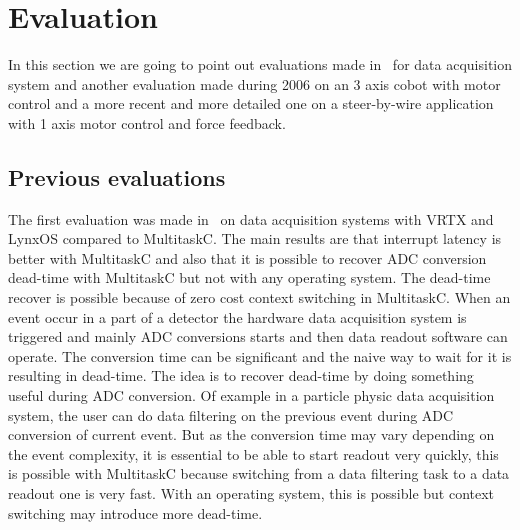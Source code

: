 \documentclass[10pt]{report}
\begin{document}
\chapter{Evaluation}
\label{sec:evaluation}

In this section we are going to point out evaluations made in~\cite{Delchini:95} for data acquisition system
and another evaluation made during 2006 on an 3 axis cobot with motor control and a more recent and more
detailed one on a steer-by-wire application with 1 axis motor control and force feedback.

\section{Previous evaluations}

The first evaluation was made in~\cite{Delchini:95} on data acquisition systems with VRTX and LynxOS compared
to MultitaskC. The main results are that interrupt latency is better with MultitaskC and also that it is possible
to recover ADC conversion dead-time with MultitaskC but not with any operating system. The dead-time recover
is possible because of zero cost context switching in MultitaskC. When an event occur in a part of a detector
the hardware data acquisition system is triggered and mainly ADC conversions starts and then data readout
software can operate. The conversion time can be significant and the naive way to wait for it is resulting
in dead-time. The idea is to recover dead-time by doing something useful during ADC conversion. Of example
in a particle physic data acquisition system, the user can do data filtering on the previous event during
ADC conversion of current event. But as the conversion time may vary depending on the event complexity,
it is essential to be able to start readout very quickly, this is possible with MultitaskC because switching
from a data filtering task to a data readout one is very fast. With an operating system, this is possible
but context switching may introduce more dead-time.
\end{document}
